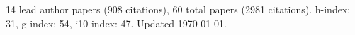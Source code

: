 14 lead author papers (908 citations),
60 total papers (2981 citations).\newline
h-index: 31, g-index: 54, i10-index: 47. Updated \today.